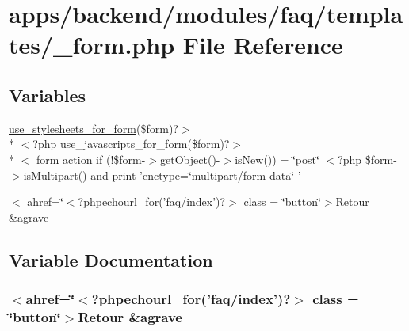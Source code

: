\hypertarget{backend_2modules_2faq_2templates_2__form_8php}{\section{apps/backend/modules/faq/templates/\-\_\-form.php File Reference}
\label{backend_2modules_2faq_2templates_2__form_8php}
}
\subsection*{Variables}
\begin{DoxyCompactItemize}
\item 
\hyperlink{live_2modules_2user_2templates_2__form_8php_a86bc4522fdbe625b07bc4a4d6eec3df7}{use\-\_\-stylesheets\-\_\-for\-\_\-form}(\$form)?$>$\\*
$<$?php use\-\_\-javascripts\-\_\-for\-\_\-form(\$form)?$>$\\*
$<$ form action \hyperlink{backend_2modules_2faq_2templates_2__form_8php_abd1acf0179bbb4a56e04d4fccdbc121f}{if} (!\$form-\/$>$get\-Object()-\/$>$is\-New()) = \char`\"{}post\char`\"{} $<$?php \$form-\/$>$is\-Multipart() and print 'enctype=\char`\"{}multipart/form-\/data\char`\"{} '
\item 
$<$ ahref=\char`\"{}$<$?phpechourl\-\_\-for('faq/index')?$>$ \hyperlink{backend_2modules_2faq_2templates_2__form_8php_a5a46e75328b11a24fc5cfbc66976af0e}{class} = \char`\"{}button\char`\"{}$>$Retour \&\hyperlink{presse_2modules_2page_2templates_2concours_ouikos_success_8php_adcbedde811e3c81b65c252edf38caea2}{agrave}
\end{DoxyCompactItemize}


\subsection{Variable Documentation}
\hypertarget{backend_2modules_2faq_2templates_2__form_8php_a5a46e75328b11a24fc5cfbc66976af0e}{
\subsubsection[{class}]{\setlength{\rightskip}{0pt plus 5cm}$<$ahref=\char`\"{}$<$?phpechourl\-\_\-for('faq/index')?$>$ class = \char`\"{}button\char`\"{}$>$Retour \&{\bf agrave}}}\label{backend_2modules_2faq_2templates_2__form_8php_a5a46e75328b11a24fc5cfbc66976af0e}


